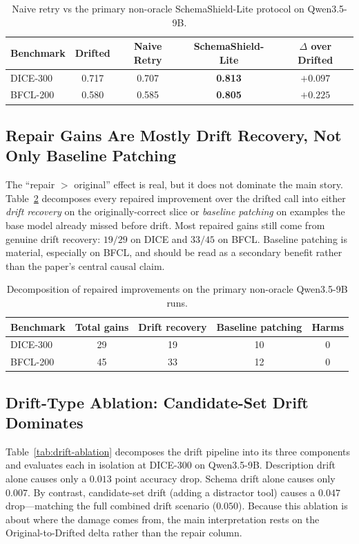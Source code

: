 \documentclass[runningheads]{llncs}
\newcommand{\method}{SchemaShield-Lite\xspace}
\begin{document}
\begin{table}[t]
\caption{Naive retry vs the primary non-oracle \method protocol on Qwen3.5-9B.}
\label{tab:naive-retry}
\centering
\small
\begin{tabular}{lcccc}
\toprule
Benchmark & Drifted & Naive Retry & \method & $\Delta$ over Drifted \\
\midrule
DICE-300   & 0.717 & 0.707 & \textbf{0.813} & $+0.097$ \\
BFCL-200   & 0.580 & 0.585 & \textbf{0.805} & $+0.225$ \\
\bottomrule
\end{tabular}
\end{table}

\subsection{Repair Gains Are Mostly Drift Recovery, Not Only Baseline Patching}
\label{sec:gain-decomposition}
The ``repair $>$ original'' effect is real, but it does not dominate the main
story. Table~\ref{tab:gain-decomposition} decomposes every repaired improvement over
the drifted call into either \emph{drift recovery} on the originally-correct slice
or \emph{baseline patching} on examples the base model already missed before drift.
Most repaired gains still come from genuine drift recovery: $19/29$ on DICE and
$33/45$ on BFCL. Baseline patching is material, especially on BFCL, and should be
read as a secondary benefit rather than the paper's central causal claim.

\begin{table}[t]
\caption{Decomposition of repaired improvements on the primary non-oracle
Qwen3.5-9B runs.}
\label{tab:gain-decomposition}
\centering
\small
\begin{tabular}{lcccc}
\toprule
Benchmark & Total gains & Drift recovery & Baseline patching & Harms \\
\midrule
DICE-300 & 29 & 19 & 10 & 0 \\
BFCL-200 & 45 & 33 & 12 & 0 \\
\bottomrule
\end{tabular}
\end{table}

\subsection{Drift-Type Ablation: Candidate-Set Drift Dominates}
\label{sec:drift-ablation}
Table~\ref{tab:drift-ablation} decomposes the drift pipeline into its three
components and evaluates each in isolation at DICE-300 on Qwen3.5-9B. Description
drift alone causes only a $0.013$ point accuracy drop. Schema drift alone causes
only $0.007$. By contrast, candidate-set drift (adding a distractor tool) causes a
$0.047$ drop---matching the full combined drift scenario ($0.050$). Because this
ablation is about where the damage comes from, the main interpretation rests on the
Original-to-Drifted delta rather than the repair column.
\end{document}
